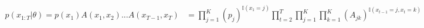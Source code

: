 $$
\begin{align*}
p(x_{1:T}|\theta) = p(x_1)A(x_1, x_2)...A(x_{T-1}, x_T) 
&= \prod_{j=1}^{K}(p_j)^{\mathbb{I}(x_1 = j)} \prod_{t=2}^{T} \prod_{j=1}^{K} \prod_{k=1}^{K}(A_{jk})^{\mathbb{I}(x_{t-1} = j, x_t = k)}
\end{align*}
$$